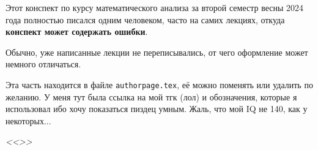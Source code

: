 Этот конспект по курсу математического анализа за второй семестр весны 2024 года
полностью писался одним человеком, часто на самих лекциях, откуда
\textbf{конспект может содержать ошибки}.

Обычно, уже написанные лекции не переписывались, от чего оформление может
немного отличаться.

Эта часть находится в файле \verb|authorpage.tex|, её можно поменять или удалить по желанию.
У меня тут была ссылка на мой тгк (лол) и обозначения, которые я использовал ибо хочу
показаться пиздец умным. Жаль, что мой IQ не 140, как у некоторых...

\vfill
\begin{center}
	\color{gray}\itshape<<\lorem>>
\end{center}
